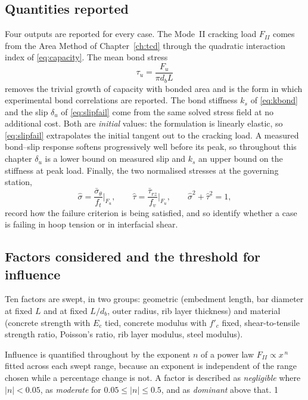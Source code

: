 \subsection{Quantities reported}

Four outputs are reported for every case. The Mode~II cracking load
$F_{II}$ comes from the Area Method of Chapter~\ref{ch:tcd} through the
quadratic interaction index of \eqref{eq:capacity}. The mean bond stress
\begin{equation}
\label{eq:taubar}
\tau_u = \frac{F_u}{\pi d_b L}
\end{equation}
removes the trivial growth of capacity with bonded area and is the form in
which experimental bond correlations are reported. The bond stiffness
$k_s$ of \eqref{eq:kbond} and the slip $\delta_u$ of \eqref{eq:slipfail}
come from the same solved stress field at no additional cost. Both are \emph{initial} values: the formulation is linearly elastic, so \eqref{eq:slipfail} extrapolates the initial tangent
out to the cracking load. A measured bond--slip response softens
progressively well before its peak, so throughout this chapter $\delta_u$ is
a lower bound on measured slip and $k_s$ an upper bound on the
stiffness at peak load. Finally, the
two normalised stresses at the governing station,
\begin{equation}
\label{eq:normstress}
\hat\sigma = \frac{\bar\sigma_\theta}{f_t}\bigg|_{F_u},
\qquad
\hat\tau = \frac{\bar\tau_{rz}}{f_v}\bigg|_{F_u},
\qquad
\hat\sigma^2 + \hat\tau^2 = 1,
\end{equation}
record how the failure criterion is being satisfied, and so identify whether
a case is failing in hoop tension or in interfacial shear.

\subsection{Factors considered and the threshold for influence}

Ten factors are swept, in two groups: geometric (embedment length, bar
diameter at fixed $L$ and at fixed $L/d_b$, outer radius, rib layer
thickness) and material (concrete strength with $E_c$ tied, concrete modulus
with $f'_c$ fixed, shear-to-tensile strength ratio, Poisson's ratio, rib
layer modulus, steel modulus).
 
Influence is quantified throughout by the exponent $n$ of a power law
$F_{II} \propto x^{\,n}$ fitted across each swept range, because an exponent
is independent of the range chosen while a percentage change is not. A
factor is described as \emph{negligible} where $|n| < 0.05$, as
\emph{moderate} for $0.05 \le |n| \le 0.5$, and as \emph{dominant} above
that. 1

